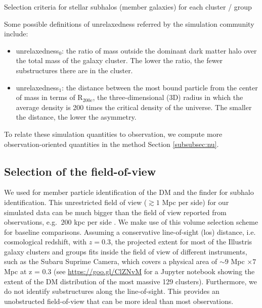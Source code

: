 \begin{table*}
\begin{center}
	\caption{ Selection criteria for stellar subhalos (member galaxies) for each
		cluster / group 
\label{tab:member_galaxy_selections}} 
  
\end{center} 
\end{table*}
Some possible definitions of unrelaxedness referred by the simulation community
include:
\begin{itemize}
	\item unrelaxedness$_0$: the ratio of mass outside the dominant dark matter halo over the total mass
		of the galaxy cluster. The lower the ratio, the fewer substructures there
		are in the cluster. 
	\item unrelaxedness$_1$: the distance between the most bound particle from
		the center of mass in terms of R$_{200c}$, the three-dimensional (3D) radius in which the
		average density is 200 times the critical density of the universe. 
		The smaller the distance, the lower the asymmetry. 
\end{itemize}
To relate these simulation quantities to observation, 
we compute more observation-oriented 
quantities in the method Section \ref{subsubsec:nu}. 

\subsection{Selection of the field-of-view}
\label{sec:FOV}


We used {} for member particle identification of the DM and the 
{} finder for subhalo identification.
This unrestricted field of view ($\gtrsim 1$ Mpc per side) for our simulated data can be much bigger than
the field of view reported from
observations, e.g. $~200$ kpc per side \citep{Zitrin2012a}. We make use of this volume selection scheme
for baseline comparisons. Assuming a conservative line-of-sight (los) distance, 
i.e. cosmological redshift, with  $z = 0.3$, 
the projected extent for most of the Illustris galaxy clusters and groups
fits inside the field of view of different instruments, such as the Subaru Suprime Camera,
which covers a physical area of $\sim 9$ Mpc $\times 7$ Mpc at z = 0.3 
(see \href{https://goo.gl/ClZNvM}{https://goo.gl/ClZNvM} for a Jupyter notebook 
showing the extent of the DM distribution of the most massive 129
clusters). Furthermore, we do not identify substructures along the line-of-sight.
This provides an unobstructed field-of-view that can be more ideal than most observations.

